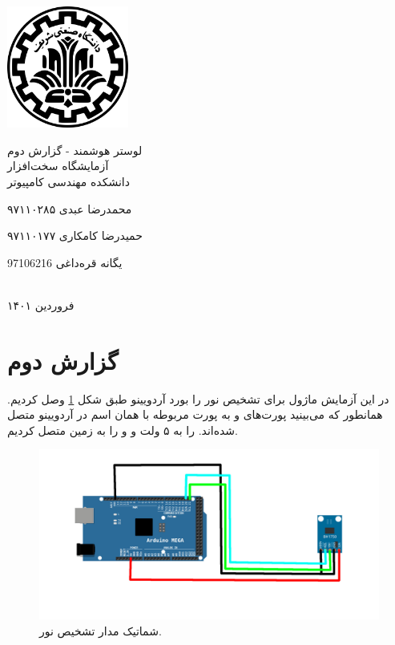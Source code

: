 \documentclass[12pt,a4paper]{article}
\begin{document}
	\thispagestyle{empty}
	\vspace*{0mm}
	\centerline{\includegraphics[height=4cm]{logo.png}}
	\vspace*{5mm}
	\begin{center}
		{\Huge
لوستر هوشمند - گزارش دوم
}
\\[1cm]
آزمایشگاه سخت‌افزار
\\[1cm]
دانشکده مهندسی کامپیوتر
\\[4cm]
{\large
محمدرضا عبدی ۹۷۱۱۰۲۸۵

حمیدرضا کامکاری ۹۷۱۱۰۱۷۷

یگانه قره‌داغی 97106216
}
	\\[5cm]
	فروردین ۱۴۰۱
	\end{center}
\newpage

\section*{گزارش دوم}

در این آزمایش ماژول 
برای تشخیص نور را بورد آردویینو طبق شکل
\ref{fig:schema}
 وصل کردیم. همانطور که می‌بینید پورت‌های
 و
 به پورت مربوطه با همان اسم در آردویینو متصل شده‌اند. 
 را به ۵ ولت و 
 و
 را به زمین متصل کردیم.
 \begin{figure}[H]
 	\centering
 	\includegraphics[scale=0.3]{figs/schema.jpg}
 	\caption{
 		شماتیک مدار تشخیص نور.
 	}
 	\label{fig:schema}
 \end{figure}
 
\end{document}

